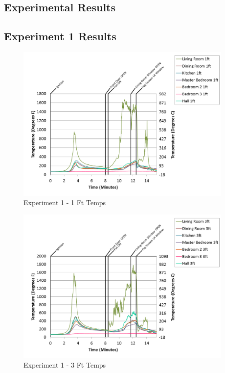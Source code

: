 \documentclass{article}
\begin{document}
\begin{appendices}

\section{Experimental Results} \label{App:Results}
\renewcommand{\thesubsection}{\Alph{section}}

\clearpage		\large
\subsection{Experiment 1 Results} \label{App:Exp1Results} 

\begin{figure}[h!]
	\centering
	\includegraphics[height=3.05in]{0_Images/Results_Charts/Exp_1_Charts/1FtTemps.png}
	\caption{Experiment 1 - 1 Ft Temps}
\end{figure}


\begin{figure}[h!]
	\centering
	\includegraphics[height=3.05in]{0_Images/Results_Charts/Exp_1_Charts/3FtTemps.png}
	\caption{Experiment 1 - 3 Ft Temps}
\end{figure}


\end{appendices}
\end{document}
